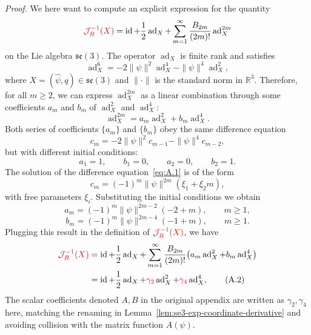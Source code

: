 \documentclass[11pt]{article}
\newcommand{\rev}[1]{\textcolor{red}{#1}}
\newenvironment{revision}{\color{red}}{}
\newcommand{\JopR}{\mathcal J_R}
\newcommand{\se}{\mathfrak{se}}
\newcommand{\ad}{\operatorname{ad}}
\newcommand{\id}{\operatorname{id}}
\newcommand{\R}{\mathbb R}
\begin{document}
\noindent\textit{Proof.} We here want to compute an explicit expression for the quantity
\begin{equation*}
\rev{\JopR^{-1}(X)}=\id+\frac12\ad_X+\sum_{m=1}^{\infty}\frac{B_{2m}}{(2m)!}\ad_X^{2m}
\end{equation*}
on the Lie algebra $\se(3)$. The operator $\ad_X$ is finite rank and satisfies
\begin{equation*}
\ad_X^6=-2\|\psi\|^2\ad_X^4-\|\psi\|^4\ad_X^2,
\end{equation*}
where $X=(\widehat\psi,q)\in\se(3)$ and $\|\cdot\|$ is the standard norm in $\R^3$. Therefore, for all $m\geq2$, we can express $\ad_X^{2m}$ as a linear combination through some coefficients $a_m$ and $b_m$ of $\ad_X^2$ and $\ad_X^4$:
\begin{equation*}
\ad_X^{2m}=a_m\ad_X^2+b_m\ad_X^4.
\end{equation*}
Both series of coefficients $\{a_m\}$ and $\{b_m\}$ obey the same difference equation
\begin{equation*}
c_m=-2\|\psi\|^2c_{m-1}-\|\psi\|^4c_{m-2},\tag{A.1}\label{eq:A.1}
\end{equation*}
but with different initial conditions:
\begin{equation*}
a_1=1,\qquad b_1=0,\qquad a_2=0,\qquad b_2=1.
\end{equation*}
The solution of the difference equation~\eqref{eq:A.1} is of the form
\begin{equation*}
c_m=(-1)^m\|\psi\|^{2m}(\xi_1+\xi_2m),
\end{equation*}
with free parameters $\xi_i$. Substituting the initial conditions we obtain
\begin{equation*}
a_m=(-1)^m\|\psi\|^{2m-2}(-2+m),\qquad m\geq1,
\end{equation*}
\begin{equation*}
b_m=(-1)^m\|\psi\|^{2m-4}(-1+m),\qquad m\geq1.
\end{equation*}
Plugging this result in the definition of $\rev{\JopR^{-1}(X)}$, we have
\begin{align*}
\rev{\JopR^{-1}(X)}
&=\id+\frac12\ad_X+\sum_{m=1}^{\infty}\frac{B_{2m}}{(2m)!}\bigl(a_m\ad_X^2+b_m\ad_X^4\bigr)\\
&=\id+\frac12\ad_X+\rev{\gamma_2}\ad_X^2+\rev{\gamma_4}\ad_X^4,\tag{A.2}\label{eq:A.2}
\end{align*}
\begin{revision}
The scalar coefficients denoted $A,B$ in the original appendix are written as $\gamma_2,\gamma_4$ here, matching the renaming in Lemma~\ref{lem:se3-exp-coordinate-derivative} and avoiding collision with the matrix function $A(\psi)$.
\end{revision}
\end{document}
